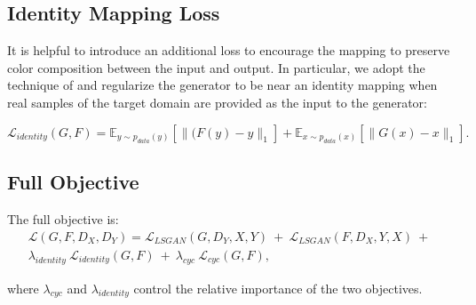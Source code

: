 \subsection{Identity Mapping Loss}

It is helpful to introduce an additional loss to encourage the mapping to preserve color composition between the input and output. In particular, we adopt the technique of \cite{taigman2016unsupervised} and regularize the generator to be near an identity mapping when real samples of the target domain are provided as the input to the generator:

\begin{equation}\label{IdentityMappingLoss}
    \mathcal{L}_{identity}(G, F) = \mathbb{E}_{y \sim p_{data}(y)}[\|(F(y) - y\|_1] + \mathbb{E}_{x \sim p_{data}(x)}[\|G(x) - x\|_1]. 
    \end{equation}

\subsection{Full Objective}

The full objective is:
\begin{equation}\label{FullObjective}
\begin{aligned}
    \mathcal{L}(G, F, D_X, D_Y) =  \mathcal{L}_{LSGAN}(G, D_Y, X, Y)\ +\ \mathcal{L}_{LSGAN}(F, D_X, Y, X)\ +\ \\
    \lambda_{identity}\ \mathcal{L}_{identity}(G, F)\ +\ \lambda_{cyc}\ \mathcal{L}_{cyc}(G, F),
\end{aligned}
\end{equation}
    
where $\lambda_{cyc}$ and $\lambda_{identity}$ control the relative importance of the two objectives.






